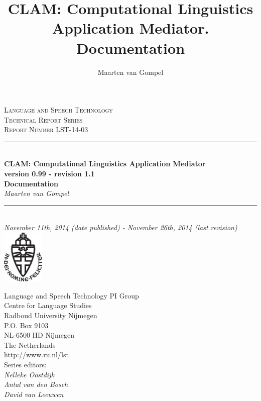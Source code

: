 \documentclass[a4paper,12pt,twoside,openright]{report}
\author{Maarten van Gompel}
\title{CLAM: Computational Linguistics Application Mediator. Documentation}
\newcommand{\HRule}{\rule{\linewidth}{0.5mm}} %
\begin{document}
\sffamily

\begin{titlepage}
\begin{center}
\textsc{\large Language and Speech Technology\\ Technical Report Series}\\[1.5cm] 
\textsc{Report Number LST-14-03}\\[0.5cm] 

\HRule \\[0.5cm]
{ \Large \bfseries CLAM: Computational Linguistics Application Mediator}\\[0.5cm] %
{\bf \small version 0.99 - revision 1.1} \\[0.5cm]
{ \Large \bfseries Documentation}\\[0.5cm]
{\large \emph{Maarten van Gompel}}\\[0.5cm]
\HRule \\[1.0cm]

\emph{November 11th, 2014 (date published) - November 26th, 2014 (last revision)} \\[0.5cm] 
\includegraphics[width=20.0mm]{ru-beeldmerk-zwart.eps}
\end{center}

\begin{minipage}{0.6\textwidth}
\begin{flushleft}
Language and Speech Technology PI Group \\
Centre for Language Studies \\
Radboud University Nijmegen \\
P.O. Box 9103 \\
NL-6500 HD Nijmegen \\
The Netherlands \\
http://www.ru.nl/lst \\[0.3cm]
Series editors: \\
\hspace{0.5cm}\emph{Nelleke Oostdijk}   \\
\hspace{0.5cm}\emph{Antal van den Bosch}  \\
\hspace{0.5cm}\emph{David van Leeuwen}  \\
\end{flushleft}
\end{minipage}

\end{titlepage}
\tableofcontents
\end{document}
